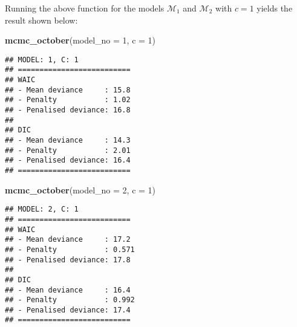 \documentclass[
]{article}
\newenvironment{Shaded}{\begin{snugshade}}{\end{snugshade}}
\newcommand{\AttributeTok}[1]{\textcolor[rgb]{0.13,0.29,0.53}{#1}}
\newcommand{\DecValTok}[1]{\textcolor[rgb]{0.00,0.00,0.81}{#1}}
\newcommand{\FunctionTok}[1]{\textcolor[rgb]{0.13,0.29,0.53}{\textbf{#1}}}
\newcommand{\NormalTok}[1]{#1}
\newcommand{\SpecialCharTok}[1]{\textcolor[rgb]{0.81,0.36,0.00}{\textbf{#1}}}
\newcommand{\StringTok}[1]{\textcolor[rgb]{0.31,0.60,0.02}{#1}}
\begin{document}
\begin{Shaded}
\end{Shaded}

Running the above function for the models \(\mathcal{M}_1\) and
\(\mathcal{M}_2\) with \(c = 1\) yields the result shown below:

\begin{Shaded}
\begin{Highlighting}[]
\FunctionTok{mcmc\_october}\NormalTok{(}\AttributeTok{model\_no =} \DecValTok{1}\NormalTok{, }\AttributeTok{c =} \DecValTok{1}\NormalTok{)}
\end{Highlighting}
\end{Shaded}

\begin{verbatim}
## MODEL: 1, C: 1
## ==========================
## WAIC
## - Mean deviance     : 15.8 
## - Penalty           : 1.02 
## - Penalised deviance: 16.8 
## 
## DIC
## - Mean deviance     : 14.3 
## - Penalty           : 2.01 
## - Penalised deviance: 16.4 
## ==========================
\end{verbatim}

\begin{Shaded}
\begin{Highlighting}[]
\FunctionTok{mcmc\_october}\NormalTok{(}\AttributeTok{model\_no =} \DecValTok{2}\NormalTok{, }\AttributeTok{c =} \DecValTok{1}\NormalTok{)}
\end{Highlighting}
\end{Shaded}

\begin{verbatim}
## MODEL: 2, C: 1
## ==========================
## WAIC
## - Mean deviance     : 17.2 
## - Penalty           : 0.571 
## - Penalised deviance: 17.8 
## 
## DIC
## - Mean deviance     : 16.4 
## - Penalty           : 0.992 
## - Penalised deviance: 17.4 
## ==========================
\end{verbatim}
\end{document}
